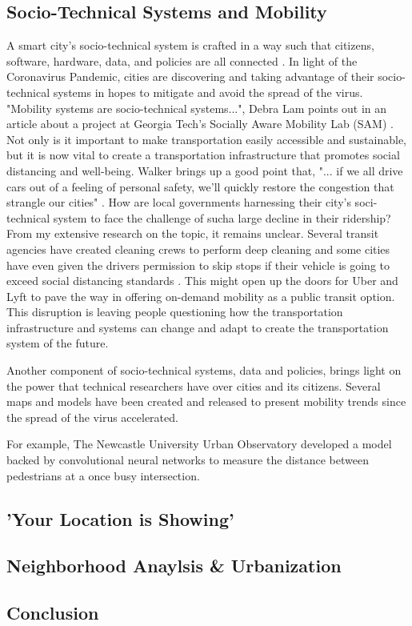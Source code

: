 \documentclass[12pt]{article}
\begin{document}
\subsection*{Socio-Technical Systems and Mobility}
A smart city's socio-technical system is crafted in a way such that citizens, software, hardware, data, and policies are all connected \cite{rangwala_2018}.
In light of the Coronavirus Pandemic, cities are discovering and taking advantage of their
socio-technical systems in hopes to mitigate and avoid the spread of the virus. "Mobility systems are socio-technical systems...", Debra Lam points out in an article about
a project at Georgia Tech's Socially Aware Mobility Lab (SAM) \cite{levine_2020}. Not only is it important to make transportation easily accessible and sustainable,
but it is now vital to create a transportation infrastructure that promotes social distancing and well-being. Walker brings up a good point that, "...
if we all drive cars out of a feeling of personal safety, we'll quickly restore the congestion that strangle our cities" \cite{walker_2020}. How are local governments
harnessing their city's soci-technical system to face the challenge of sucha  large decline in their ridership? From my extensive research on the topic, it remains unclear.
Several transit agencies have created cleaning crews to perform deep cleaning and some cities have even given the drivers permission to skip stops if their vehicle is going 
to exceed social distancing standards \cite{hawkins_2020}. This might open up the doors for Uber and Lyft to pave the way in offering on-demand mobility as a public transit 
option. This disruption is leaving people questioning how 
the transportation infrastructure and systems can change and adapt to create the transportation system of the future. 

Another component of socio-technical systems, data 
and policies, brings light on the power that technical researchers have over cities and its citizens. Several maps and models have been created and 
released to present mobility trends since the spread of the virus accelerated. 


For example, The Newcastle University Urban
Observatory developed a model backed by convolutional neural networks to measure the distance between pedestrians at a once 
busy intersection. 


\subsection*{'Your Location is Showing'}


\subsection*{Neighborhood Anaylsis \& Urbanization}

\subsection*{Conclusion}



\end{document}

